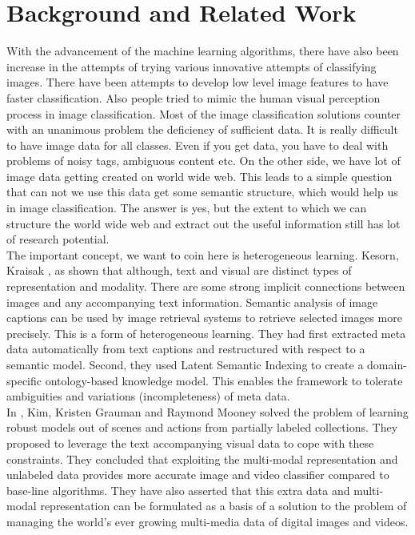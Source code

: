 
\chapter{Background and Related Work} %

\label{relatedWork} %


With the advancement of the machine learning algorithms, there have also been increase in the attempts of trying various innovative attempts of classifying images. There have been attempts to develop low level image features to have faster classification. Also people tried to mimic the human visual perception process in image classification. Most of the image classification solutions counter with an unanimous problem the deficiency of sufficient data. It is really difficult to have image data for all classes. Even if you get data, you have to deal with problems of noisy tags, ambiguous content etc. On the other side, we have lot of image data getting created on world wide web. This leads to a simple question that can not we use this data get some semantic structure, which would help us in image classification. The answer is yes, but the extent to which we can structure the world wide web and extract out the useful information still has lot of research potential.\\ 
\hspace*{1cm} The important concept, we want to coin here is heterogeneous learning. Kesorn, Kraisak \cite{kesorn}, as shown that although, text and visual are distinct types of representation and modality. There are some strong implicit connections between images and any accompanying text information. Semantic analysis of image captions can be used by image retrieval systems to retrieve selected images more precisely. This is a form of heterogeneous learning. They had first extracted meta data automatically from text captions and restructured with respect to a semantic model. Second, they used Latent Semantic Indexing to create a domain-specific ontology-based knowledge model. This enables the framework to tolerate ambiguities and variations (incompleteness) of meta data.\\
%
\hspace*{1cm} In \cite{Gupta}, Kim, Kristen Grauman and Raymond Mooney solved the problem of learning robust models out of scenes and actions from partially labeled collections. They proposed to leverage the text accompanying visual data to cope with these constraints. They concluded that exploiting the multi-modal representation and unlabeled data provides more accurate image and video classifier compared to base-line algorithms. They have also asserted that this extra data and multi-modal representation can be formulated as a basis of a solution to the problem of managing the world's ever growing multi-media data of digital images and videos.\\
